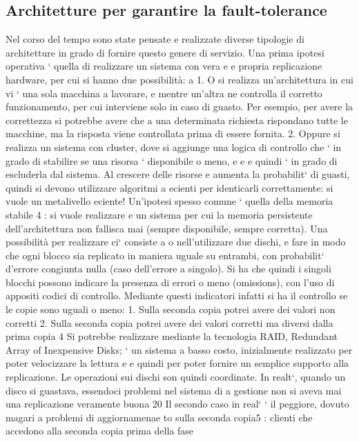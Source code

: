 \documentclass[a4paper,12pt]{article}
\begin{document}
\subsection{Architetture per garantire la fault-tolerance}
Nel corso del tempo sono state pensate e realizzate diverse tipologie di architetture in grado di fornire questo genere
di servizio.
Una prima ipotesi operativa ` quella di realizzare un sistema con vera e
e
propria replicazione hardware, per cui si hanno due possibilità:
a
1. O si realizza un'architettura in cui vi ` una sola macchina a lavorare,
e
mentre un'altra ne controlla il corretto funzionamento, per cui interviene
solo in caso di guasto. Per esempio, per avere la correttezza si potrebbe
avere che a una determinata richiesta rispondano tutte le macchine, ma
la risposta viene controllata prima di essere fornita.
2. Oppure si realizza un sistema con cluster, dove si aggiunge una logica di
controllo che ` in grado di stabilire se una risorsa ` disponibile o meno,
e
e
e quindi ` in grado di escluderla dal sistema. Al crescere delle risorse
e
aumenta la probabilit` di guasti, quindi si devono utilizzare algoritmi
a
ecienti per identicarli correttamente: si vuole un metalivello eciente!
Un'ipotesi spesso comune ` quella della memoria stabile 4 : si vuole realizzare
e
un sistema per cui la memoria persistente dell'architettura non fallisca mai
(sempre disponibile, sempre corretta). Una possibilità per realizzare ci` consiste
a
o
nell'utilizzare due dischi, e fare in modo che ogni blocco sia replicato in maniera
uguale su entrambi, con probabilit` d'errore congiunta nulla (caso dell'errore
a
singolo). Si ha che quindi i singoli blocchi possono indicare la presenza di errori
o meno (omissions), con l'uso di appositi codici di controllo. Mediante questi
indicatori infatti si ha il controllo se le copie sono uguali o meno:
1. Sulla seconda copia potrei avere dei valori non corretti
2. Sulla seconda copia potrei avere dei valori corretti ma diversi dalla prima
copia
4 Si potrebbe realizzare mediante la tecnologia RAID, Redundant Array of Inexpensive
Disks; ` un sistema a basso costo, inizialmente realizzato per poter velocizzare la lettura e
e
quindi per poter fornire un semplice supporto alla replicazione. Le operazioni sui dischi son
quindi coordinate. In realt`, quando un disco si guastava, essendoci problemi nel sistema di
a
gestione non si aveva mai una replicazione veramente buona
20
Il secondo caso in real` ` il peggiore, dovuto magari a problemi di aggiornamenae
to sulla seconda copia5 : clienti che accedono alla seconda copia prima della fase
\end{document}
